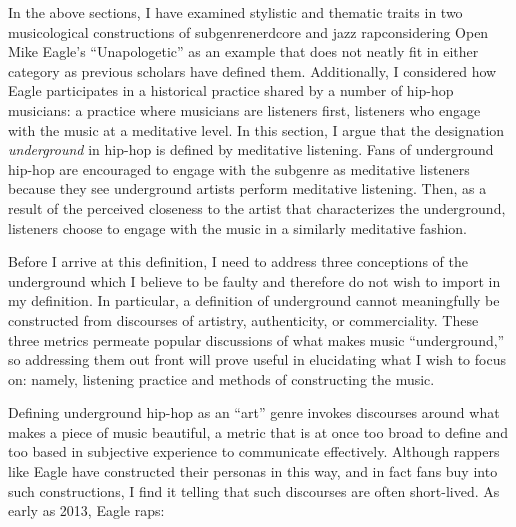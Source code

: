 In the above sections, I have examined stylistic and thematic traits in two musicological 
constructions of subgenre\textemdash nerdcore and jazz rap\textemdash considering Open Mike
Eagle's ``Unapologetic'' as an example that does not neatly fit in either category as previous
scholars have defined them. Additionally, I considered how Eagle participates in a historical
practice shared by a number of hip-hop musicians: a practice where musicians are listeners first,
listeners who engage with the music at a meditative level. In this section, I argue that the 
designation \emph{underground} in hip-hop is defined by meditative listening. Fans of underground
hip-hop are encouraged to engage with the subgenre as meditative listeners because they see 
underground artists perform meditative listening. Then, as a result of the perceived closeness to
the artist that characterizes the underground, listeners choose to engage with the music in a 
similarly meditative fashion.

Before I arrive at this definition, I need to address three conceptions of the underground which I
believe to be faulty and therefore do not wish to import in my definition. In particular, a definition
of underground cannot meaningfully be constructed from discourses of artistry, authenticity, or 
commerciality. These three metrics permeate popular discussions of what makes music ``underground,'' 
so addressing them out front will prove useful in elucidating what I wish to focus on: namely, 
listening practice and methods of constructing the music.

Defining underground hip-hop as an ``art'' genre invokes discourses around what makes a piece of
music beautiful, a metric that is at once too broad to define and too based in subjective experience
to communicate effectively. Although rappers like Eagle have constructed their personas in this way,
and in fact fans buy into such constructions, I find it telling that such discourses are often
short-lived. As early as 2013, Eagle raps:

